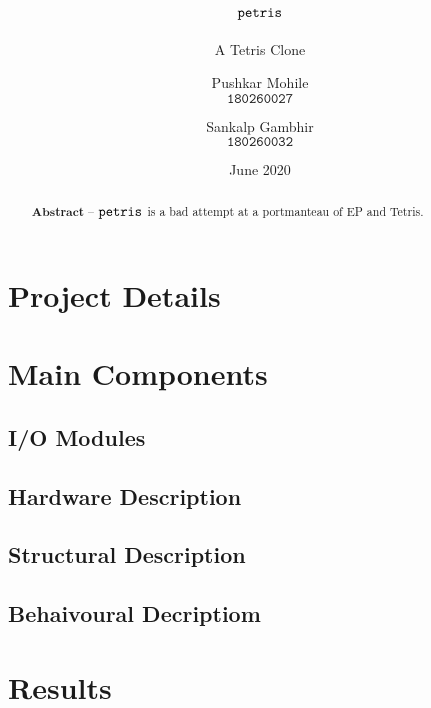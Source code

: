 \documentclass[10pt, a4paper, egregdoesnotlikesansseriftitles]{scrartcl}
\title{$\texttt{petris}$}
\subtitle{A Tetris Clone}
\author{
    Pushkar Mohile \\
    $\texttt{180260027}$
    \and
    Sankalp Gambhir \\
    $\texttt{180260032}$
    }
\date{June 2020}
\begin{document}
\maketitle

\begin{abstract}
    \centering
    $\textbf{Abstract --}$
    $\texttt{petris}$ is a bad attempt at a portmanteau of 
    EP and Tetris.
\end{abstract}


\section{Project Details}


\section{Main Components}
\subsection{I/O Modules}

\subsection{Hardware Description}
\subsection{Structural Description }
\subsection{Behaivoural Decriptiom}


\section{Results}

\end{document}
